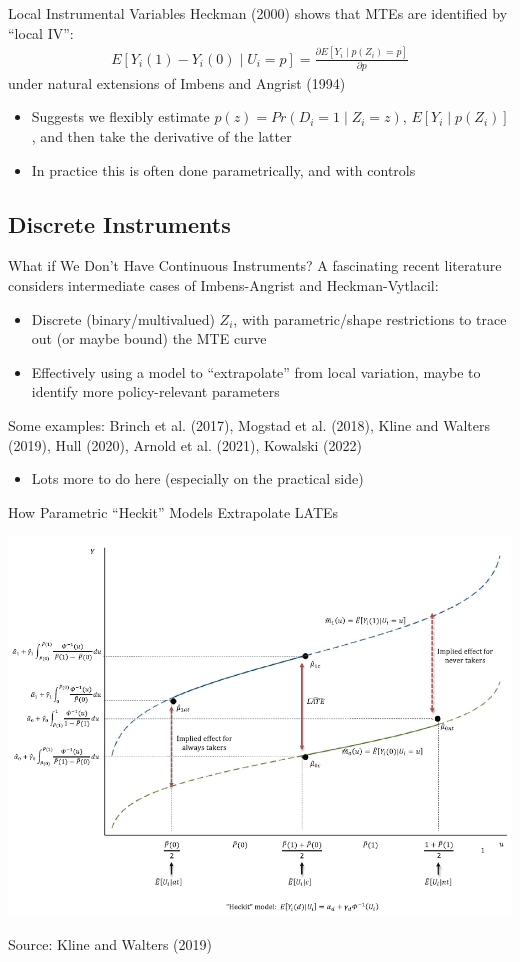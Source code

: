 \documentclass{beamer}
\begin{document}
\begin{frame}{Local Instrumental Variables}
Heckman (2000) shows that MTEs are identified by ``local IV'':\smallskip
\begin{align*}
E[Y_i(1)-Y_i(0)\mid U_i=p]=\frac{\partial E[Y_i\mid p(Z_i)=p]}{\partial p}
\end{align*}
under natural extensions of Imbens and Angrist (1994)\smallskip\pause{}
\begin{itemize}
\item Suggests we flexibly estimate $p(z)=Pr(D_i=1\mid Z_i=z)$, $E[Y_i\mid p(Z_i)]$, and then take the derivative of the latter\smallskip
\item In practice this is often done parametrically, and with controls
\end{itemize}

\end{frame}

\subsection{Discrete Instruments}
\begin{frame}{What if We Don't Have Continuous Instruments?}
A fascinating recent literature considers intermediate cases of Imbens-Angrist and Heckman-Vytlacil:\smallskip
\begin{itemize}
\item Discrete (binary/multivalued) $Z_i$, with parametric/shape restrictions to trace out (or maybe bound) the MTE curve\smallskip
\item Effectively using a model to ``extrapolate'' from local variation, maybe to identify more policy-relevant parameters
\end{itemize}\medskip\pause{}
Some examples: Brinch et al. (2017),  Mogstad et al. (2018), Kline and Walters (2019), Hull (2020), Arnold et al. (2021), Kowalski (2022)\smallskip
\begin{itemize}
\item Lots more to do here (especially on the practical side)
\end{itemize}
\end{frame}

\begin{frame}{How Parametric ``Heckit'' Models Extrapolate LATEs}
\vspace{-0.3cm}
\begin{center}
\includegraphics[scale=0.4]{./lecture_includes/kline_walters.png}
\end{center}
Source: Kline and Walters (2019) 
\end{frame}
\end{document}
